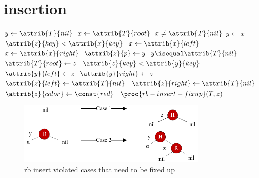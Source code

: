 \documentclass[UTF8,11pt,openany]{ctexbook}
\begin{document}
\newpage 
\section{insertion}
\begin{codebox}
	\li    $ y \gets \attrib{T}{nil} $
	\li    $ x \gets \attrib{T}{root} $
    \li     \While $ x \ne  \attrib{T}{nil}$ 
    \li     \Do $ y \gets x $
    \li         \If   $ \attrib{z}{key} < \attrib{x}{key} $
    \li         \Then $ x \gets \attrib{x}{left} $
    \li         \Else $ x \gets \attrib{x}{right} $
    			\End
            \End
    \li     $\attrib{z}{p} \gets y$ 
    \li         \If   $ y \isequal \attrib{T}{nil} $
    \li         \Then $  \attrib{T}{root}  \gets z $
    \li         \ElseIf $ \attrib{z}{key} < \attrib{y}{key}$
    \li         \Then   $ \attrib{y}{left}  \gets z  $
    \li  		\ElseNoIf  $ \attrib{y}{right}  \gets z  $    				
   				\End
   	\li    $ \attrib{z}{left}  \gets \attrib{T}{nil}$
   	\li    $ \attrib{z}{right}  \gets \attrib{T}{nil}$
   	\li    $ \attrib{z}{color}  \gets \const{red}$
	\li 			 $\proc{rb-insert-fixup}(T,z)$	
\end{codebox}

\begin{figure}[h] %
	\centering %
	\includegraphics[width=0.8\textwidth]{vector/red-black-tree/insert/rb_insert_violated_cases.pdf} %
	\caption{rb insert violated cases that need to be fixed up } %
	\label{rb_insert_violated_cases} %
\end{figure}%
\end{document}
